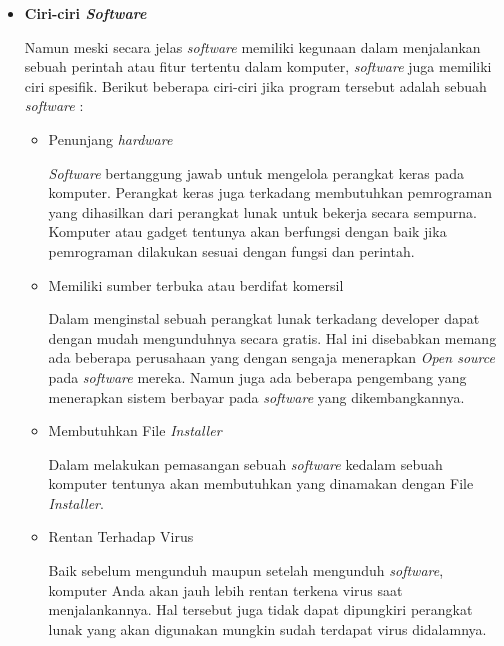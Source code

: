 \documentclass[12pt]{article}
\begin{document}
    \begin{itemize}
        
        \item \textbf{Ciri-ciri \textit{Software}} 
        \par
        Namun meski secara jelas \textit{software} memiliki kegunaan dalam menjalankan sebuah perintah atau fitur tertentu dalam komputer, \textit{software} juga memiliki ciri spesifik. Berikut beberapa ciri-ciri jika program tersebut adalah sebuah \textit{software} :
        \begin{itemize}
            \item Penunjang \textit{hardware}
            \par
            \textit{Software} bertanggung jawab untuk mengelola perangkat keras pada komputer. Perangkat keras juga terkadang membutuhkan pemrograman yang dihasilkan dari perangkat lunak untuk bekerja secara sempurna. Komputer atau gadget tentunya akan berfungsi dengan baik jika pemrograman dilakukan sesuai dengan fungsi dan perintah.
            \item Memiliki sumber terbuka atau berdifat komersil
            \par
            Dalam menginstal sebuah perangkat lunak terkadang developer dapat dengan mudah mengunduhnya secara gratis. Hal ini disebabkan memang ada beberapa perusahaan yang dengan sengaja menerapkan \textit{Open source} pada \textit{software} mereka. Namun juga ada beberapa pengembang yang menerapkan sistem berbayar pada \textit{software} yang dikembangkannya.
            \item Membutuhkan File \textit{Installer}
            \par
            Dalam melakukan pemasangan sebuah \textit{software} kedalam sebuah komputer tentunya akan membutuhkan yang dinamakan dengan File \textit{Installer}.
            \item Rentan Terhadap Virus
            \par
            Baik sebelum mengunduh maupun setelah mengunduh \textit{software}, komputer Anda akan jauh lebih rentan terkena virus saat menjalankannya. Hal tersebut juga tidak dapat dipungkiri perangkat lunak yang akan digunakan mungkin sudah terdapat virus didalamnya.
        \end{itemize}


\end{itemize}
\end{document}
